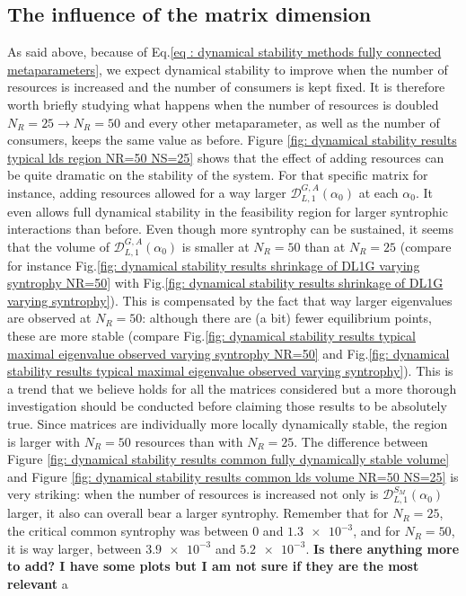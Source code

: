 \documentclass[12pt, titlepage]{report}
\begin{document}
\subsection{The influence of the matrix dimension}
As said above, because of Eq.\eqref{eq : dynamical stability methods fully connected metaparameters}, we expect dynamical stability to improve when the number of resources is increased and the number of consumers is kept fixed. It is therefore worth briefly studying what happens when the number of resources is doubled $N_R=25 \rightarrow N_R=50$ and every other metaparameter, as well as the number of consumers, keeps the same value as before.
Figure \ref{fig: dynamical stability results typical lds region NR=50 NS=25} shows that the effect of adding resources can be quite dramatic on the stability of the system. For that specific matrix for instance, adding resources allowed for a way larger $\mathcal{D}^{G,A}_{L,1}\left(\alpha_0\right)$ at each $\alpha_0$. It even allows full dynamical stability in the feasibility region for larger syntrophic interactions than before.
Even though more syntrophy can be sustained, it seems that the volume of $\mathcal{D}_{L,1}^{G,A}(\alpha_0)$ is smaller at $N_R=50$ than at $N_R=25$ (compare for  instance Fig.\ref{fig: dynamical stability results shrinkage of DL1G varying syntrophy NR=50} with Fig.\ref{fig: dynamical stability results shrinkage of DL1G varying syntrophy}). This is compensated by the fact that way larger eigenvalues are observed at $N_R=50$: although there are (a bit) fewer equilibrium points, these are more stable (compare Fig.\ref{fig: dynamical stability results typical maximal eigenvalue observed varying syntrophy NR=50} and Fig.\ref{fig: dynamical stability results typical maximal eigenvalue observed varying syntrophy}). This is a trend that we believe holds for all the matrices considered but a more thorough investigation should be conducted before claiming those results to be absolutely true. Since matrices are individually more locally dynamically stable, the  region is larger with $N_R=50$ resources than with $N_R=25$. The difference between Figure \ref{fig: dynamical stability results common fully dynamically stable volume} and Figure \ref{fig: dynamical stability results common lds volume NR=50 NS=25} is very striking: when the number of resources is increased not only is $\mathcal{D}_{L,1}^{S_M}\left(\alpha_0\right)$ larger, it also can overall bear a larger syntrophy. Remember that for $N_R=25$, the critical common syntrophy was between $0$ and $\num{1.3e-3}$, and for $N_R=50$, it is way larger, between $\num{3.9e-3}$ and $\num{5.2e-3}$. \textbf{Is there anything more to add? I have some plots but I am not sure if they are the most relevant}
a
\FloatBarrier

\end{document}
